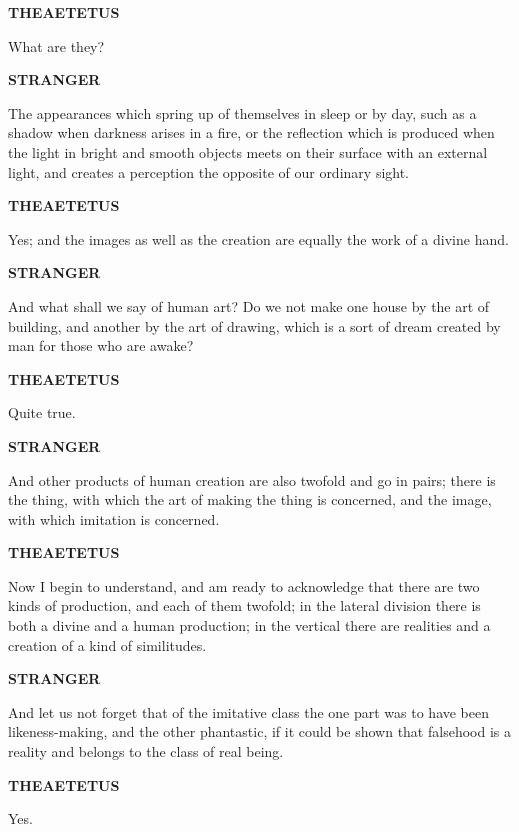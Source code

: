 \documentclass[11pt,letter]{article}
\begin{document}
\par \textbf{THEAETETUS}
\par   What are they?

\par \textbf{STRANGER}
\par   The appearances which spring up of themselves in sleep or by day, such as a shadow when darkness arises in a fire, or the reflection which is produced when the light in bright and smooth objects meets on their surface with an external light, and creates a perception the opposite of our ordinary sight.

\par \textbf{THEAETETUS}
\par   Yes; and the images as well as the creation are equally the work of a divine hand.

\par \textbf{STRANGER}
\par   And what shall we say of human art? Do we not make one house by the art of building, and another by the art of drawing, which is a sort of dream created by man for those who are awake?

\par \textbf{THEAETETUS}
\par   Quite true.

\par \textbf{STRANGER}
\par   And other products of human creation are also twofold and go in pairs; there is the thing, with which the art of making the thing is concerned, and the image, with which imitation is concerned.

\par \textbf{THEAETETUS}
\par   Now I begin to understand, and am ready to acknowledge that there are two kinds of production, and each of them twofold; in the lateral division there is both a divine and a human production; in the vertical there are realities and a creation of a kind of similitudes.

\par \textbf{STRANGER}
\par   And let us not forget that of the imitative class the one part was to have been likeness-making, and the other phantastic, if it could be shown that falsehood is a reality and belongs to the class of real being.

\par \textbf{THEAETETUS}
\par   Yes.
\end{document}
